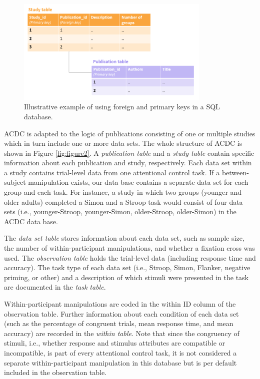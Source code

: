 \documentclass[
  man,floatsintext]{apa6}
\begin{document}
\begin{figure}

{\centering \includegraphics[width=350px]{images/illustrate_SQL_keys} 

}

\caption{Illustrative example of using foreign and primary keys in a SQL database.}\label{fig:figure1}
\end{figure}

ACDC is adapted to the logic of publications consisting of one or multiple studies which in turn include one or more data sets. The whole structure of ACDC is shown in Figure \ref{fig:figure2}. A \emph{publication table} and a \emph{study table} contain specific information about each publication and study, respectively. Each data set within a study contains trial-level data from one attentional control task. If a between-subject manipulation exists, our data base contains a separate data set for each group and each task. For instance, a study in which two groups (younger and older adults) completed a Simon and a Stroop task would consist of four data sets (i.e., younger-Stroop, younger-Simon, older-Stroop, older-Simon) in the ACDC data base.

The \emph{data set table} stores information about each data set, such as sample size, the number of within-participant manipulations, and whether a fixation cross was used. The \emph{observation table} holds the trial-level data (including response time and accuracy). The task type of each data set (i.e., Stroop, Simon, Flanker, negative priming, or other) and a description of which stimuli were presented in the task are documented in the \emph{task table}.

Within-participant manipulations are coded in the within ID column of the observation table. Further information about each condition of each data set (such as the percentage of congruent trials, mean response time, and mean accuracy) are recorded in the \emph{within table}. Note that since the congruency of stimuli, i.e., whether response and stimulus attributes are compatible or incompatible, is part of every attentional control task, it is not considered a separate within-participant manipulation in this database but is per default included in the observation table.
\end{document}
